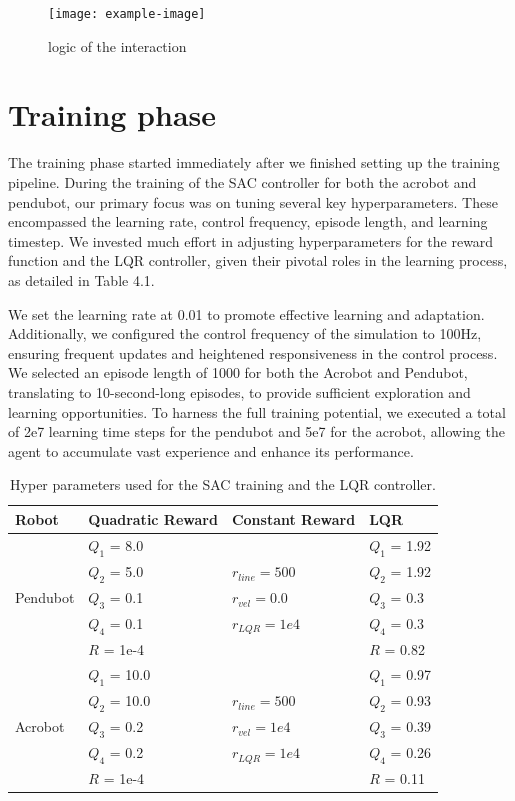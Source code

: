 \begin{figure}[H]
    \centering
    \texttt{[image: example-image]}
    \caption{logic of the interaction}
    \label{fig:my_label}
\end{figure}

\section{Training phase}
The training phase started immediately after we finished setting up the training pipeline. During the training of the SAC controller for both the acrobot and pendubot, our primary focus was on tuning several key hyperparameters. These encompassed the learning rate, control frequency, episode length, and learning timestep. We invested much effort in adjusting hyperparameters for the reward function and the LQR controller, given their pivotal roles in the learning process, as detailed in Table 4.1.

We set the learning rate at 0.01 to promote effective learning and adaptation. Additionally, we configured the control frequency of the simulation to 100Hz, ensuring frequent updates and heightened responsiveness in the control process. We selected an episode length of 1000 for both the Acrobot and Pendubot, translating to 10-second-long episodes, to provide sufficient exploration and learning opportunities. To harness the full training potential, we executed a total of 2e7 learning time steps for the pendubot and 5e7 for the acrobot, allowing the agent to accumulate vast experience and enhance its performance.


\begin{table}[H]
  \centering
  \begin{tabular}{p{2cm} | p{3cm} | p{3cm} | p{3cm}}
  Robot & Quadratic Reward  & Constant Reward & LQR\\
  \hline
  \multirow{5}{*}{Pendubot} & \(Q_1\) = 8.0  &  & \(Q_1\) = 1.92\\
  & \(Q_2\) = 5.0  & \(r_{line}=500\) & \(Q_2\) = 1.92\\
  & \(Q_3\) = 0.1  & \(r_{vel}=0.0\) & \(Q_3\) = 0.3\\
  & \(Q_4\) = 0.1  & \(r_{LQR}=1e4\)& \(Q_4\) = 0.3\\
  & \(R\) = 1e-4  & & \(R\) = 0.82\\
  \hline
  \multirow{5}{*}{Acrobot} & \(Q_1\) = 10.0  &  & \(Q_1\) = 0.97\\
  & \(Q_2\) = 10.0  & \(r_{line}=500\) & \(Q_2\) = 0.93\\
  & \(Q_3\) = 0.2  & \(r_{vel}=1e4\) & \(Q_3\) = 0.39\\
  & \(Q_4\) = 0.2  & \(r_{LQR}=1e4\) & \(Q_4\) = 0.26\\
  & \(R\) = 1e-4  &  & \(R\) = 0.11\\
  \end{tabular}
 \caption{Hyper parameters used for the SAC training and the LQR controller.}
 \label{tab:parameters}
\end{table}

